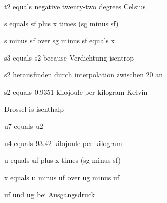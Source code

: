 t2 equals negative twenty-two degrees Celsius

s equals sf plus x times (sg minus sf)

s minus sf over sg minus sf equals x

s3 equals s2 because Verdichtung isentrop

s2 herausfinden durch interpolation zwischen 20 an

s2 equals 0.9351 kilojoule per kilogram Kelvin

Drossel is isenthalp

u7 equals u2

u4 equals 93.42 kilojoule per kilogram

u equals uf plus x times (sg minus sf)

x equals u minus uf over ug minus uf

uf und ug bei Ausgangsdruck